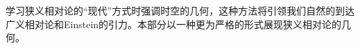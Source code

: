 
学习狭义相对论的“现代”方式时强调时空的几何，这种方法将引领我们自然的到达广义相对论和Einstein的引力。本部分以一种更为严格的形式展现狭义相对论的几何。






















